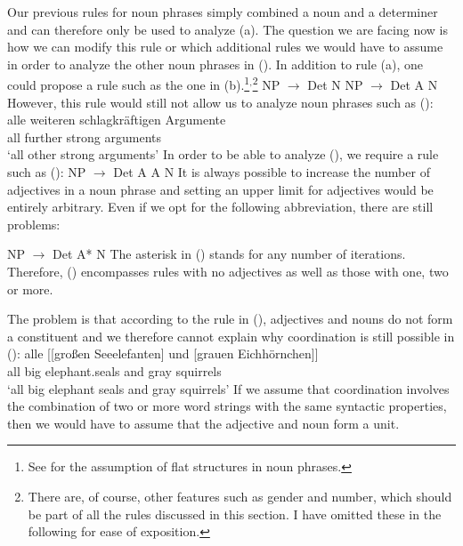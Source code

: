Our previous rules for noun phrases simply combined a noun and a determiner and can therefore only be used to
analyze (a). The question we are facing now is how we can modify this rule or which additional rules we would
have to assume in order to analyze the other noun phrases in (). In addition to rule (a), one could propose 
a rule such as the one in (b).\footnote{%
	See  for the assumption of flat structures in noun phrases.
}$^,$\footnote{%
	There are, of course, other features such as gender and number, which should be part of all the rules
	discussed in this section. I have omitted these in the following for ease of exposition.
}
\eal
\ex NP $\to$ Det N
\ex NP $\to$ Det A N
\zl
However, this rule would still not allow us to analyze noun phrases such as ():
\ea
\label{Beispiel-alle-weitern-schlagkraeftigen-Argumente}
\gll alle weiteren schlagkräftigen Argumente\\
     all further strong arguments\\
\glt `all other strong arguments'
\z
In order to be able to analyze (), we require a rule such as (): 
\ea 
NP $\to$ Det A A N
\z
It is always possible to increase the number of adjectives in a noun phrase and setting an upper limit for
adjectives would be entirely arbitrary. Even if we opt for the following abbreviation, there are still problems:

\ea 
NP $\to$ Det A* N
\z
The asterisk\is{*} in () stands for any number of iterations. Therefore, () encompasses rules with no adjectives
as well as those with one, two or more.

The problem is that according to the rule in (), adjectives and nouns do not form a constituent and we therefore cannot explain why coordination 
is still possible in ():
\ea
\label{ex-alle-grossen-Seeelefanten-und}
\gll alle [[großen Seeelefanten] und [grauen Eichhörnchen]]\\
     all  \spacebr{}\spacebr{}big elephant.seals and  \spacebr{}gray squirrels\\
\glt `all big elephant seals and gray squirrels'	 
\z
If we assume that coordination involves the combination of two or more word strings with the same syntactic properties, then we would have to assume
that the adjective and noun form a unit.

